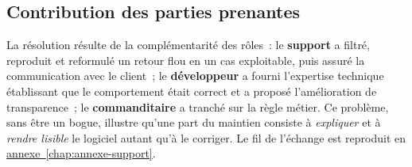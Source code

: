 \subsection{Contribution des parties prenantes}
La résolution résulte de la complémentarité des rôles~: le \textbf{support} a filtré, reproduit et reformulé un retour flou en un cas exploitable, puis assuré la communication avec le client~; le \textbf{développeur} a fourni l'expertise technique établissant que le comportement était correct et a proposé l'amélioration de transparence~; le \textbf{commanditaire} a tranché sur la règle métier. Ce problème, sans être un bogue, illustre qu'une part du maintien consiste à \emph{expliquer} et à \emph{rendre lisible} le logiciel autant qu'à le corriger. Le fil de l'échange est reproduit en \hyperref[chap:annexe-support]{annexe~\ref*{chap:annexe-support}}.

